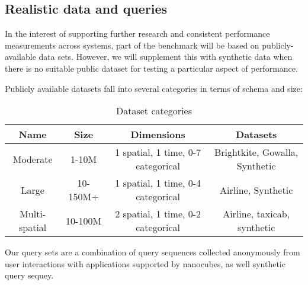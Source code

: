 \documentclass[journal]{vgtc}                %
\begin{document}
\subsection{Realistic data and queries}

In the interest of supporting further research and consistent performance measurements across systems, part of the benchmark will be based on publicly-available data sets. However, we will supplement this with synthetic data when there is no suitable public dataset for testing a particular aspect of performance.

Publicly available datasets fall into several categories in terms of schema and size:

\begin{table}
 \caption{Dataset categories}
 \label{categories}
 \scriptsize
 \begin{center}
   \begin{tabular}{cccc}
     Name & Size & Dimensions & Datasets \\
   \hline
     Moderate & 1-10M & 1 spatial, 1 time, 0-7 categorical & Brightkite, Gowalla, Synthetic \\
     Large & 10-150M+ & 1 spatial, 1 time, 0-4 categorical & Airline, Synthetic \\ 
	 Multi-spatial & 10-100M & 2 spatial, 1 time, 0-2 categorical & Airline, taxicab, synthetic\\
   \end{tabular}
 \end{center}
\end{table}


Our query sets are a combination of query sequences collected anonymously from user interactions with applications supported by nanocubes, as well synthetic query sequey.

\end{document}
